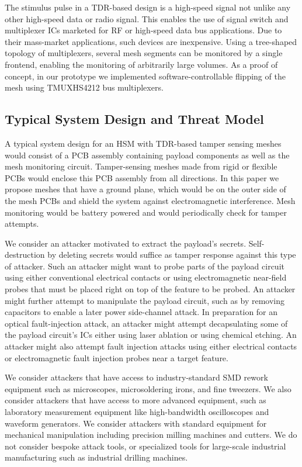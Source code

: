 \documentclass[final]{iacrtrans}
\newcommand{\partno}[1]{\textsf{\small#1}}
\begin{document}
The stimulus pulse in a TDR-based design is a high-speed signal not unlike any other high-speed data or radio signal.
This enables the use of signal switch and multiplexer ICs marketed for RF or high-speed data bus applications. Due to
their mass-market applications, such devices are inexpensive. Using a tree-shaped topology of multiplexers, several mesh
segments can be monitored by a single frontend, enabling the monitoring of arbitrarily large volumes. As a proof of
concept, in our prototype we implemented software-controllable flipping of the mesh using \partno{TMUXHS4212} bus
multiplexers.

\subsection{Typical System Design and Threat Model}
\label{sec_system_design}

A typical system design for an HSM with TDR-based tamper sensing meshes would consist of a PCB assembly containing
payload components as well as the mesh monitoring circuit. Tamper-sensing meshes made from rigid or flexible PCBs would
enclose this PCB assembly from all directions. In this paper we propose meshes that have a ground plane, which would be
on the outer side of the mesh PCBs and shield the system against electromagnetic interference. Mesh monitoring would be
battery powered and would periodically check for tamper attempts.

We consider an attacker motivated to extract the payload's secrets. Self-destruction by deleting secrets would suffice
as tamper response against this type of attacker. Such an attacker might want to probe parts of the payload circuit
using either conventional electrical contacts or using electromagnetic near-field probes that must be placed right on
top of the feature to be probed. An attacker might further attempt to manipulate the payload circuit, such as by
removing capacitors to enable a later power side-channel attack. In preparation for an optical fault-injection attack,
an attacker might attempt decapsulating some of the payload circuit's ICs either using laser ablation or using chemical
etching. An attacker might also attempt fault injection attacks using either electrical contacts or electromagnetic
fault injection probes near a target feature.

We consider attackers that have access to industry-standard SMD rework equipment such as microscopes, microsoldering
irons, and fine tweezers. We also consider attackers that have access to more advanced equipment, such as laboratory
measurement equipment like high-bandwidth oscilloscopes and waveform generators. We consider attackers with standard
equipment for mechanical manipulation including precision milling machines and cutters. We do not consider bespoke
attack tools, or specialized tools for large-scale industrial manufacturing such as industrial drilling machines.
\end{document}
